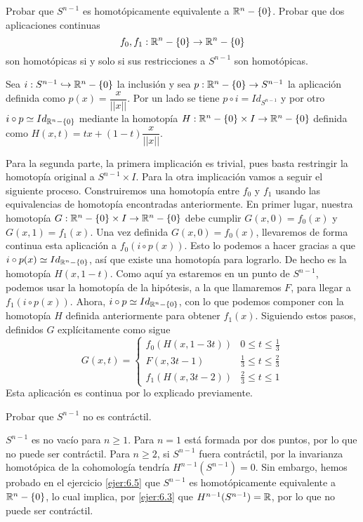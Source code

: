 \documentclass[twoside]{article}
\begin{document}
\begin{ejercicio}{6.5}
Probar que $S^{n-1}$ es homotópicamente equivalente a $\mathbb{R}^n-\{0\}$. Probar que dos aplicaciones continuas
\[
f_0,f_1:\mathbb{R}^n-\{0\}\to\mathbb{R}^n-\{0\}
\]
son homotópicas si y solo si sus restricciones a $S^{n-1}$ son homotópicas.
\end{ejercicio}
\begin{solucion}
Sea $i:S^{n-1}\hookrightarrow \mathbb{R}^n-\{0\}$ la inclusión y sea $p:\mathbb{R}^n-\{0\}\to S^{n-1}$ la aplicación definida como $p(x)=\dfrac{x}{||x||}$. Por un lado se tiene $p\circ i=Id_{S^{n-1}}$ y por otro $i\circ p\simeq Id_{\mathbb{R}^n-\{0\}}$ mediante la homotopía $H:\mathbb{R}^n-\{0\}\times I\to \mathbb{R}^n-\{0\}$ definida como $H(x,t)=tx+(1-t)\dfrac{x}{||x||}$. 

Para la segunda parte, la primera implicación es trivial, pues basta restringir la homotopía original a $S^{n-1}\times I$. Para la otra implicación vamos a seguir el siguiente proceso. Construiremos una homotopía entre $f_0$ y $f_1$ usando las equivalencias de homotopía encontradas anteriormente. En primer lugar, nuestra homotopía $G:\mathbb{R}^n-\{0\}\times I\to \mathbb{R}^n-\{0\}$ debe cumplir $G(x,0)=f_0(x)$ y $G(x,1)=f_1(x)$. Una vez definida $G(x,0)=f_0(x)$, llevaremos de forma continua esta aplicación a $f_0(i\circ p(x))$.  Esto lo podemos a hacer gracias a que $i\circ p(x)\simeq Id_{\mathbb{R}^n-\{0\}}$, así que existe una homotopía para lograrlo. De hecho es la homotopía $H(x,1-t)$. Como aquí ya estaremos en un punto de $S^{n-1}$, podemos usar la homotopía de la hipótesis, a la que llamaremos $F$, para llegar a $f_1(i\circ p(x))$. Ahora, $i\circ p \simeq Id_{\mathbb{R}^n-\{0\}}$, con lo que podemos componer con la homotopía $H$ definida anteriormente para obtener $f_1(x)$. Siguiendo estos pasos, definidos $G$ explícitamente como sigue
\[
G(x,t)=\begin{cases}
f_0(H(x,1-3t)) & 0\leq t\leq \frac{1}{3}\\
F(x, 3t-1) & \frac{1}{3}\leq t\leq\frac{2}{3}\\
f_1(H(x, 3t-2)) & \frac{2}{3}\leq t\leq 1
\end{cases}
\]
Esta aplicación es continua por lo explicado previamente.
\end{solucion}

\newpage

\begin{ejercicio}{6.6}
Probar que $S^{n-1}$ no es contráctil.
\end{ejercicio}
\begin{solucion}
$S^{n-1}$ es no vacío para $n\geq 1$. Para $n=1$ está formada por dos puntos, por lo que no puede ser contráctil. Para $n\geq 2$, si $S^{n-1}$ fuera contráctil, por la invarianza homotópica de la cohomología tendría $H^{n-1}(S^{n-1})=0$. Sin embargo, hemos probado en el ejercicio \ref{ejer:6.5} que $S^{n-1}$ es homotópicamente equivalente a $\mathbb{R}^n-\{0\}$, lo cual implica, por \ref{ejer:6.3} que $H^{n-1}(S^{n-1})=\mathbb{R}$, por lo que no puede ser contráctil. 
\end{solucion}
\end{document}
